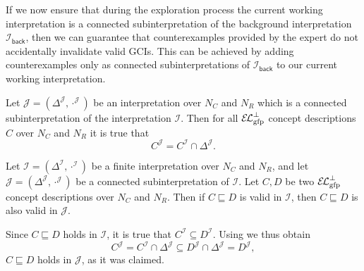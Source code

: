 If we now ensure that during the exploration process the current working interpretation is
a connected subinterpretation of the background interpretation
$\mathcal{I}_{\mathsf{back}}$, then we can guarantee that counterexamples provided by the
expert do not accidentally invalidate valid GCIs.  This can be achieved by adding
counterexamples only as connected subinterpretations of $\mathcal{I}_{\mathsf{back}}$ to
our current working interpretation.

\begin{Lemma}
  \label{lem:Felix-6.12}
  Let $\mathcal{J} = (\Delta^{\mathcal{J}}, \cdot^{\mathcal{J}})$ be an interpretation
  over $N_{C}$ and $N_{R}$ which is a connected subinterpretation of the interpretation
  $\mathcal{I}$.  Then for all ${{\mathcal{E}\kern-.3ex\mathcal{L}}_\text{gfp}^\bot}$ concept descriptions $C$ over $N_{C}$ and
  $N_{R}$ it is true that
  \begin{equation*}
    C^{\mathcal{J}} = C^{\mathcal{I}} \cap \Delta^{\mathcal{J}}.
  \end{equation*}
\end{Lemma}

\begin{Theorem}
  \label{thm:GCIs-valid-in-interpretations-are-also-valid-in-connected-subinterpretations}
  Let $\mathcal{I} = (\Delta^{\mathcal{I}}, \cdot^{\mathcal{I}})$ be a finite
  interpretation over $N_{C}$ and $N_{R}$, and let $\mathcal{J} = (\Delta^{\mathcal{J}},
  \cdot^{\mathcal{J}})$ be a connected subinterpretation of $\mathcal{I}$.  Let $C, D$ be
  two ${{\mathcal{E}\kern-.3ex\mathcal{L}}_\text{gfp}^\bot}$ concept descriptions over $N_{C}$ and $N_{R}$.  Then if $C \sqsubseteq
  D$ is valid in $\mathcal{I}$, then $C \sqsubseteq D$ is also valid in $\mathcal{J}$.
\end{Theorem}
\begin{Proof}
  Since $C \sqsubseteq D$ holds in $\mathcal{I}$, it is true that $C^{\mathcal{I}}
  \subseteq D^{\mathcal{I}}$.  Using  we thus obtain
  \begin{equation*}
    C^{\mathcal{J}} = C^{\mathcal{I}} \cap \Delta^{\mathcal{J}} \subseteq D^{\mathcal{J}}
    \cap \Delta^{\mathcal{J}} = D^{\mathcal{J}},
  \end{equation*}
  \ie $C \sqsubseteq D$ holds in $\mathcal{J}$, as it was claimed.
\end{Proof}

